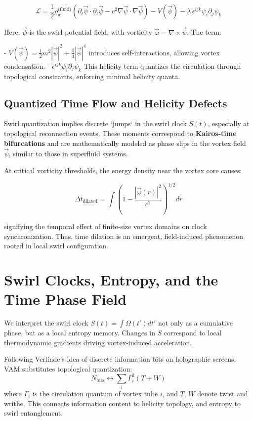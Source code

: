 \documentclass[12pt]{article}
\begin{document}
\[
    \mathcal{L} = \frac{1}{2} \rho_{\text{\ae}}^{\text{(fluid)}} \left( \partial_t \vec{\psi} \cdot \partial_t \vec{\psi} - c^2 \nabla \vec{\psi} \cdot \nabla \vec{\psi} \right) - V(\vec{\psi}) - \lambda \, \epsilon^{ijk} \psi_i \partial_j \psi_k
\]

Here, \( \vec{\psi} \) is the swirl potential field, with vorticity \( \vec{\omega} = \nabla \times \vec{\psi} \). The term:

- \( V(\vec{\psi}) = \frac{1}{2} m^2 |\vec{\psi}|^2 + \frac{\beta}{4} |\vec{\psi}|^4 \) introduces self-interactions, allowing vortex condensation.
- \( \epsilon^{ijk} \psi_i \partial_j \psi_k \) This helicity term quantizes the circulation through topological constraints, enforcing minimal helicity quanta.

\subsection{Quantized Time Flow and Helicity Defects}

Swirl quantization implies discrete `jumps` in the swirl clock \( S(t) \), especially at topological reconnection events. These moments correspond to \textbf{Kairos-time bifurcations} and are mathematically modeled as phase slips in the vortex field \( \vec{\psi} \), similar to those in superfluid systems.

At critical vorticity thresholds, the energy density near the vortex core causes:

\[
    \Delta t_{\text{dilated}} = \int \left( 1 - \frac{|\vec{\omega}(r)|^2}{c^2} \right)^{1/2} dr
\]

signifying the temporal effect of finite-size vortex domains on clock synchronization. Thus, time dilation is an emergent, field-induced phenomenon rooted in local swirl configuration.


    \section{Swirl Clocks, Entropy, and the Time Phase Field}

    We interpret the swirl clock \( S(t) = \int \Omega(t') dt' \) not only as a cumulative phase, but as a local entropy memory. Changes in \( S \) correspond to local thermodynamic gradients driving vortex-induced acceleration.

    Following Verlinde’s idea of discrete information bits on holographic screens, VAM substitutes topological quantization:
    \[
        N_{\text{bits}} \longleftrightarrow \sum_i \Gamma_i^2 (T + W)
    \]
    where \( \Gamma_i \) is the circulation quantum of vortex tube \( i \), and \( T \), \( W \) denote twist and writhe. This connects information content to helicity topology, and entropy to swirl entanglement.
\end{document}
